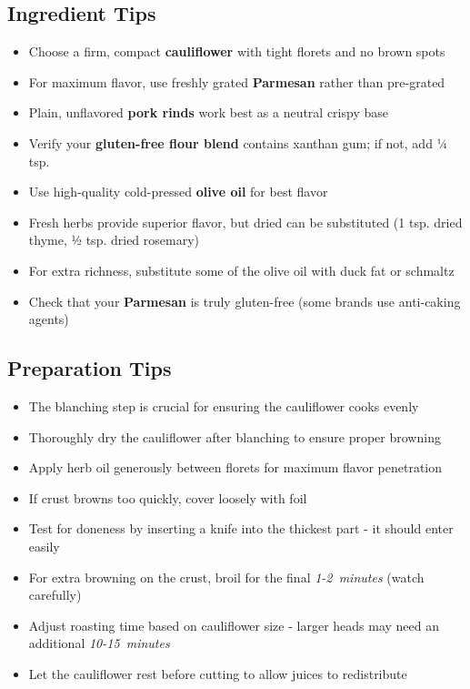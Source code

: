 \documentclass[11pt,letterpaper]{article}
\begin{document}
{\begin{multicols}{2}
\subsection*{Ingredient Tips}
\begin{itemize}
    \item Choose a firm, compact \textbf{cauliflower} with tight florets and no brown spots
    \item For maximum flavor, use freshly grated \textbf{Parmesan} rather than pre-grated
    \item Plain, unflavored \textbf{pork rinds} work best as a neutral crispy base
    \item Verify your \textbf{gluten-free flour blend} contains xanthan gum; if not, add ¼ tsp.
    \item Use high-quality cold-pressed \textbf{olive oil} for best flavor
    \item Fresh herbs provide superior flavor, but dried can be substituted (1 tsp. dried thyme, ½ tsp. dried rosemary)
    \item For extra richness, substitute some of the olive oil with duck fat or schmaltz
    \item Check that your \textbf{Parmesan} is truly gluten-free (some brands use anti-caking agents)
\end{itemize}

\subsection*{Preparation Tips}
\begin{itemize}
    \item The blanching step is crucial for ensuring the cauliflower cooks evenly
    \item Thoroughly dry the cauliflower after blanching to ensure proper browning
    \item Apply herb oil generously between florets for maximum flavor penetration
    \item If crust browns too quickly, cover loosely with foil
    \item Test for doneness by inserting a knife into the thickest part - it should enter easily
    \item For extra browning on the crust, broil for the final \textit{1-2~minutes} (watch carefully)
    \item Adjust roasting time based on cauliflower size - larger heads may need an additional \textit{10-15~minutes}
    \item Let the cauliflower rest before cutting to allow juices to redistribute
\end{itemize}


\end{multicols}}
\end{document}

